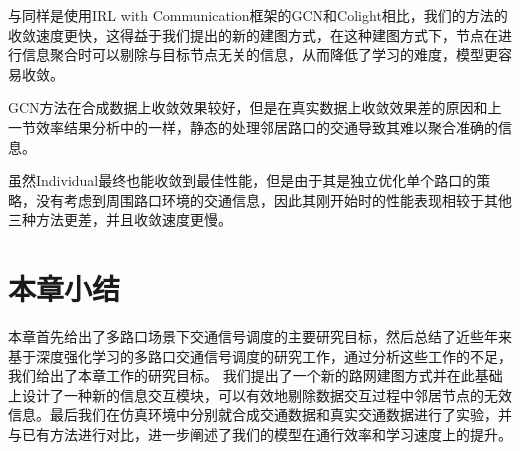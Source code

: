 与同样是使用IRL with Communication框架的GCN和Colight相比，我们的方法的收敛速度更快，这得益于我们提出的新的建图方式，在这种建图方式下，节点在进行信息聚合时可以剔除与目标节点无关的信息，从而降低了学习的难度，模型更容易收敛。

GCN方法在合成数据上收敛效果较好，但是在真实数据上收敛效果差的原因和上一节效率结果分析中的一样，静态的处理邻居路口的交通导致其难以聚合准确的信息。

虽然Individual最终也能收敛到最佳性能，但是由于其是独立优化单个路口的策略，没有考虑到周围路口环境的交通信息，因此其刚开始时的性能表现相较于其他三种方法更差，并且收敛速度更慢。

\section{本章小结}
本章首先给出了多路口场景下交通信号调度的主要研究目标，然后总结了近些年来基于深度强化学习的多路口交通信号调度的研究工作，通过分析这些工作的不足，我们给出了本章工作的研究目标。
我们提出了一个新的路网建图方式并在此基础上设计了一种新的信息交互模块，可以有效地剔除数据交互过程中邻居节点的无效信息。最后我们在仿真环境中分别就合成交通数据和真实交通数据进行了实验，并与已有方法进行对比，进一步阐述了我们的模型在通行效率和学习速度上的提升。